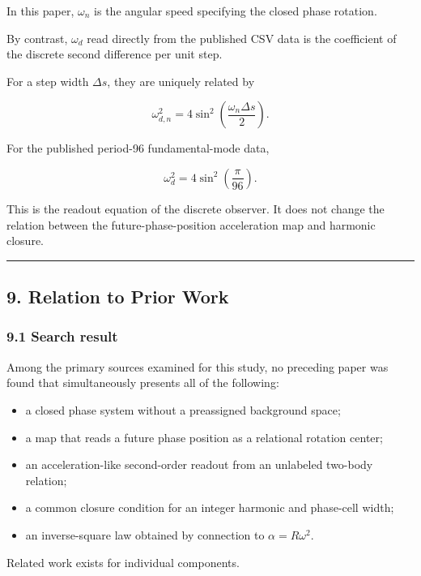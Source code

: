 \documentclass[
  10pt,
  a4paper,
]{article}
\providecommand{\tightlist}{%
  \setlength{\itemsep}{0pt}\setlength{\parskip}{0pt}}
\begin{document}
In this paper, \(\omega_n\) is the angular speed specifying the closed
phase rotation.

By contrast, \(\omega_d\) read directly from the published CSV data is
the coefficient of the discrete second difference per unit step.

For a step width \(\Delta s\), they are uniquely related by

\[
\omega_{d,n}^2
=4\sin^2\left(\frac{\omega_n\Delta s}{2}\right).
\]

For the published period-96 fundamental-mode data,

\[
\omega_d^2
=4\sin^2\left(\frac{\pi}{96}\right).
\]

This is the readout equation of the discrete observer. It does not
change the relation between the future-phase-position acceleration map
and harmonic closure.

\begin{center}\rule{0.5\linewidth}{0.5pt}\end{center}

\subsection{9. Relation to Prior Work}\label{relation-to-prior-work}

\subsubsection{9.1 Search result}\label{search-result}

Among the primary sources examined for this study, no preceding paper
was found that simultaneously presents all of the following:

\begin{itemize}
\tightlist
\item
  a closed phase system without a preassigned background space;
\item
  a map that reads a future phase position as a relational rotation
  center;
\item
  an acceleration-like second-order readout from an unlabeled two-body
  relation;
\item
  a common closure condition for an integer harmonic and phase-cell
  width;
\item
  an inverse-square law obtained by connection to \(\alpha=R\omega^2\).
\end{itemize}

Related work exists for individual components.
\end{document}
